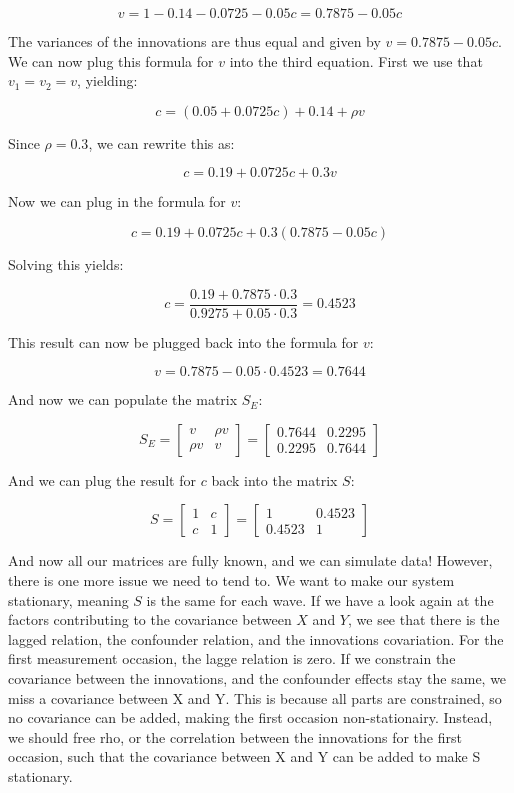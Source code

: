 \documentclass{article}
\begin{document}
\[
v = 1 - 0.14 - 0.0725 - 0.05c = 0.7875 - 0.05c
\]

\noindent
The variances of the innovations are thus equal and given by $v = 0.7875 - 0.05c$. We can now plug this formula for 
$v$ into the third equation. First we use that $v_1 = v_2 = v$, yielding:

\[
c = (0.05 + 0.0725c) + 0.14 + \rho v
\]

\noindent
Since $\rho = 0.3$, we can rewrite this as:

\[
c = 0.19 + 0.0725c + 0.3v
\]

\noindent
Now we can plug in the formula for $v$:

\[
c = 0.19 + 0.0725c + 0.3(0.7875 - 0.05c)
\]

\noindent
Solving this yields:

\[
c = \frac{0.19 + 0.7875 \cdot 0.3}{0.9275 + 0.05 \cdot 0.3} = 0.4523
\]

\noindent
This result can now be plugged back into the formula for $v$:

\[
v = 0.7875 - 0.05 \cdot 0.4523 = 0.7644
\]

\noindent
And now we can populate the matrix $S_E$:

\[
S_E =
\begin{bmatrix}
v & \rho v \\
\rho v & v
\end{bmatrix}
=
\begin{bmatrix}
0.7644 & 0.2295 \\
0.2295 & 0.7644
\end{bmatrix}
\]

\noindent
And we can plug the result for $c$ back into the matrix $S$:

\[
S =
\begin{bmatrix}
1 & c \\
c & 1
\end{bmatrix}
=
\begin{bmatrix}
1 & 0.4523 \\
0.4523 & 1
\end{bmatrix}
\]

\noindent
And now all our matrices are fully known, and we can simulate data! However, there is one more issue we need to tend to. 
We want to make our system stationary, meaning $S$ is the same for each wave. If we have a look again at the factors
contributing to the covariance between $X$ and $Y$, we see that there is the lagged relation, the confounder relation,
and the innovations covariation. For the first measurement occasion, the lagge relation is zero. If we constrain the covariance
between the innovations, and the confounder effects stay the same, we miss a covariance between X and Y. This is because
all parts are constrained, so no covariance can be added, making the first occasion non-stationairy. Instead, we should free
rho, or the correlation between the innovations for the first occasion, such that the covariance between X and Y can be added
to make S stationary. 
\end{document}
